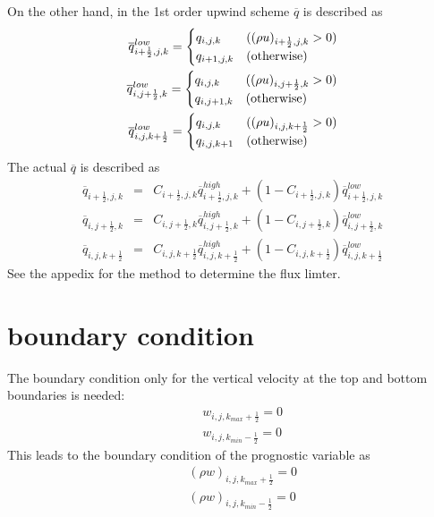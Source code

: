 \begin{description}
On the other hand, in the 1st order upwind scheme 
$\overline{q}$ is described as
\begin{eqnarray}
\overline{q}_{i+\frac{1}{2},j,k}^{low} = 
\begin{cases}
  q_{i,j,k} & ( (\rho u)_{i+\frac{1}{2},j,k}>0 )\\
  q_{i+1,j,k} & ({\rm otherwise})\\
\end{cases}
\\
\overline{q}_{i,j+\frac{1}{2},k}^{low} = 
\begin{cases}
  q_{i,j,k} & ( (\rho u)_{i,j+\frac{1}{2},k}>0 )\\
  q_{i,j+1,k} & ({\rm otherwise})\\
\end{cases}
\\
\overline{q}_{i,j,k+\frac{1}{2}}^{low} = 
\begin{cases}
  q_{i,j,k} & ( (\rho u)_{i,j,k+\frac{1}{2}}>0 )\\
  q_{i,j,k+1} & ({\rm otherwise})\\
\end{cases}
\end{eqnarray}
The actual $\overline{q}$ is described as
\begin{eqnarray}
  \overline{q}_{i+\frac{1}{2},j,k}  
&=& C_{i+\frac{1}{2},j,k} \overline{q}_{i+\frac{1}{2},j,k}^{high}
+ \left( 1 - C_{i+\frac{1}{2},j,k}\right) \overline{q}_{i+\frac{1}{2},j,k}^{low}\\
  \overline{q}_{i,j+\frac{1}{2},k}  
&=& C_{i,j+\frac{1}{2},k} \overline{q}_{i,j+\frac{1}{2},k}^{high}
+ \left( 1 - C_{i,j+\frac{1}{2},k}\right) \overline{q}_{i,j+\frac{1}{2},k}^{low}\\
  \overline{q}_{i,j,k+\frac{1}{2}}  
&=& C_{i,j,k+\frac{1}{2}} \overline{q}_{i,j,k+\frac{1}{2}}^{high}
+ \left( 1 - C_{i,j,k+\frac{1}{2}}\right) \overline{q}_{i,j,k+\frac{1}{2}}^{low}
\end{eqnarray}
See the appedix for the method to determine the flux limter.
\end{description}



\section{boundary condition}
The boundary condition only for the vertical velocity at the top and bottom
boundaries is needed:
\begin{eqnarray}
&&  w_{i,j,k_{max}+\frac{1}{2}} = 0\\
&&  w_{i,j,k_{min}-\frac{1}{2}} = 0
\end{eqnarray}
This leads to the boundary condition of the prognostic variable as
\begin{eqnarray}
&&  (\rho w)_{i,j,k_{max}+\frac{1}{2}} = 0\\
&&  (\rho w)_{i,j,k_{min}-\frac{1}{2}} = 0
\end{eqnarray}



